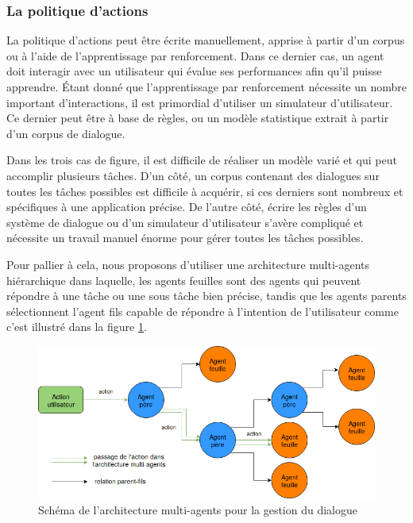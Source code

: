 \subsubsection{La politique d'actions}
La politique d'actions peut être écrite manuellement, apprise à partir d'un corpus ou à l'aide de l'apprentissage par renforcement. Dans ce dernier cas, un agent doit interagir avec un utilisateur qui évalue ses performances afin qu'il puisse apprendre. Étant donné que l'apprentissage par renforcement nécessite un nombre important d'interactions, il est primordial d'utiliser un simulateur d'utilisateur. Ce dernier peut être à base de règles, ou un modèle statistique extrait à partir d'un corpus de dialogue.
\par Dans les trois cas de figure, il est difficile de réaliser un modèle varié et qui peut accomplir plusieurs tâches. D'un côté, un corpus contenant des dialogues sur toutes les tâches possibles est difficile à acquérir, si ces derniers sont nombreux et spécifiques à une application précise. De l'autre côté, écrire les règles d'un système de dialogue ou d'un simulateur d'utilisateur s'avère compliqué et nécessite un travail manuel énorme pour gérer toutes les tâches possibles.
\par Pour pallier à cela, nous proposons d'utiliser une architecture multi-agents hiérarchique dans laquelle, les agents feuilles sont des agents qui peuvent répondre à une tâche ou une sous tâche bien précise, tandis que les agents parents sélectionnent l'agent fils capable de répondre à l'intention de l'utilisateur comme c'est illustré dans la figure \ref{multiagent}.
\begin{figure}[H] 
	
	\centering
	\includegraphics[width=0.8\linewidth]{images/Conception/DM/multiagent.png}
	\caption{Schéma de l'architecture multi-agents pour la gestion du dialogue}\label{multiagent}
\end{figure}
